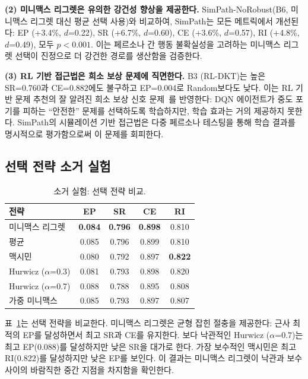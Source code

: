 \documentclass[runningheads]{llncs}
\begin{document}
\textbf{(2) 미니맥스 리그렛은 유의한 강건성 향상을 제공한다.}
SimPath-NoRobust(B6, 미니맥스 리그렛 대신 평균 선택 사용)와 비교하여, SimPath는 모든 메트릭에서 개선된다: EP (+3.4\%, $d$=0.22), SR (+6.7\%, $d$=0.60), CE (+3.6\%, $d$=0.57), RI (+4.8\%, $d$=0.49), 모두 $p<0.001$.
이는 페르소나 간 행동 불확실성을 고려하는 미니맥스 리그렛 선택이 진정으로 더 강건한 경로를 생산함을 검증한다.

\textbf{(3) RL 기반 접근법은 희소 보상 문제에 직면한다.}
B3 (RL-DKT)는 높은 SR=0.760과 CE=0.882에도 불구하고 EP=0.004로 Random보다도 낮다.
이는 RL 기반 문제 추천의 잘 알려진 희소 보상 신호 문제~\cite{cseal2019}를 반영한다: DQN 에이전트가 중도 포기를 피하는 ``안전한'' 문제를 선택하도록 학습하지만, 학습 효과는 거의 제공하지 못한다.
SimPath의 시뮬레이션 기반 접근법은 다중 페르소나 테스팅을 통해 학습 결과를 명시적으로 평가함으로써 이 문제를 회피한다.

\subsection{선택 전략 소거 실험}

\begin{table}[t]
\centering
\caption{소거 실험: 선택 전략 비교.}
\label{tab:ablation_strategy}
\begin{tabular}{lcccc}
\toprule
\textbf{전략} & \textbf{EP} & \textbf{SR} & \textbf{CE} & \textbf{RI} \\
\midrule
미니맥스 리그렛  & \textbf{0.084} & \textbf{0.796} & \textbf{0.898} & 0.810 \\
평균            & 0.085 & 0.796 & 0.899 & 0.810 \\
맥시민          & 0.080 & 0.792 & 0.897 & \textbf{0.822} \\
Hurwicz ($\alpha$=0.3) & 0.081 & 0.793 & 0.898 & 0.820 \\
Hurwicz ($\alpha$=0.7) & 0.088 & 0.788 & 0.895 & 0.808 \\
가중 미니맥스   & 0.085 & 0.793 & 0.897 & 0.807 \\
\bottomrule
\end{tabular}
\end{table}

표~\ref{tab:ablation_strategy}는 선택 전략을 비교한다.
미니맥스 리그렛은 균형 잡힌 절충을 제공한다: 근사 최적의 EP를 달성하면서 최고 SR과 CE를 유지한다.
보다 낙관적인 Hurwicz ($\alpha$=0.7)는 최고 EP(0.088)를 달성하지만 낮은 SR을 대가로 한다.
가장 보수적인 맥시민은 최고 RI(0.822)를 달성하지만 낮은 EP를 보인다.
이 결과는 미니맥스 리그렛이 낙관과 보수 사이의 바람직한 중간 지점을 차지함을 확인한다.
\end{document}

